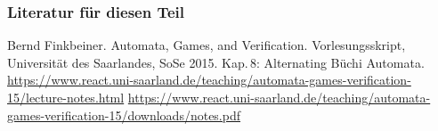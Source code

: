     \begin{frame}
      \frametitle{Literatur für diesen Teil}
      \begin{small}
        \begin{thebibliography}{99}
            Bernd Finkbeiner.
            \newblock
            Automata, Games, and Verification.
            \newblock
            Vorlesungsskript, Universität des Saarlandes, SoSe 2015.
            \newblock
            Kap.\,8: Alternating Büchi Automata.
            \newblock
            \url{https://www.react.uni-saarland.de/teaching/automata-games-verification-15/lecture-notes.html}
            \newblock
            \url{https://www.react.uni-saarland.de/teaching/automata-games-verification-15/downloads/notes.pdf}
        \end{thebibliography}
        \par
      \end{small}
      \note{~}
    \end{frame}



